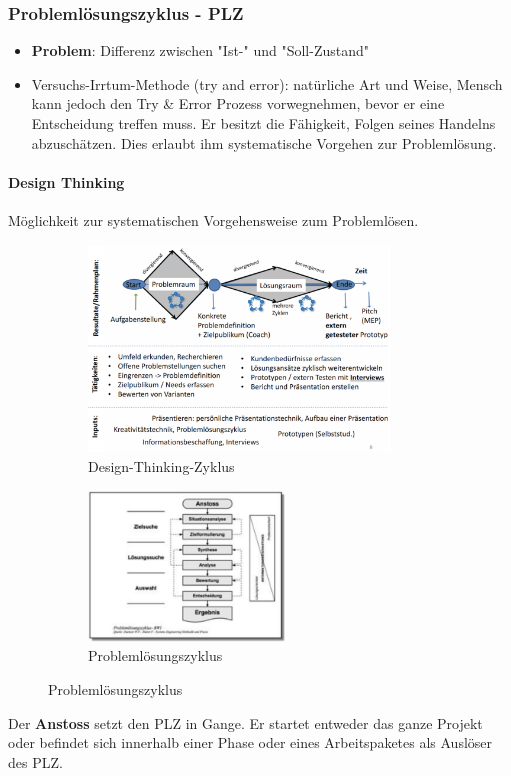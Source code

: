 \documentclass[a4paper]{article}
\begin{document}
\newpage
		
		\subsubsection{Problemlösungszyklus - PLZ}
	
		\begin{itemize}
			\item \textbf{Problem}: Differenz zwischen "Ist-" und "Soll-Zustand"
			\item Versuchs-Irrtum-Methode (try and error): natürliche Art und Weise, Mensch kann jedoch den Try \& Error Prozess vorwegnehmen, bevor er eine Entscheidung treffen muss.
			Er besitzt die Fähigkeit, Folgen seines Handelns abzuschätzen.
			Dies erlaubt ihm systematische Vorgehen zur Problemlösung.
		\end{itemize}
	
		\paragraph{Design Thinking}
		
			Möglichkeit zur systematischen Vorgehensweise zum Problemlösen.
			
			\begin{figure}[!htb]
				\centering
				\begin{subfigure}{.5\textwidth}
					\centering
					\includegraphics[height=5.5cm]{img/pm/design_thinking.png}
					\caption{Design-Thinking-Zyklus}
					\label{fig:pm_designthinking}
				\end{subfigure}
				\begin{subfigure}{.4\textwidth}
					\centering
					\includegraphics[height=4cm]{img/pm/plz.png}
					\caption{Problemlösungszyklus}
					\label{fig:pm_plz}
				\end{subfigure}
			\end{figure}
			\noindent		
			Der \textbf{Anstoss} setzt den PLZ in Gange.
			Er startet entweder das ganze Projekt oder befindet sich innerhalb einer Phase oder eines Arbeitspaketes als Auslöser des PLZ.
				
\end{document}
